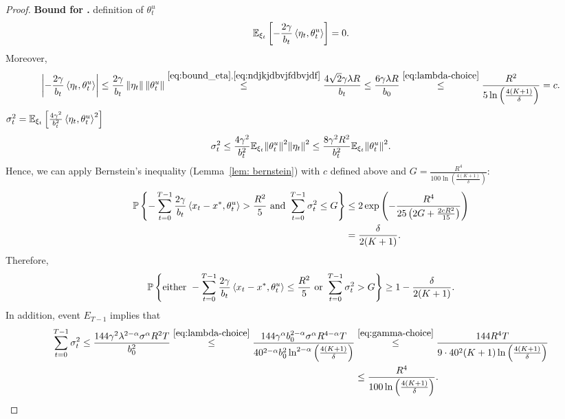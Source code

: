 \documentclass{article}
\begin{document}
\begin{proof}
    \textbf{Bound for \circledOne.}  definition of $\theta_t^u$ 
    \begin{align*}
        {\mathbb E}_{\xi_t} \left[-\frac{2\gamma}{b_t} \left \langle \eta_t, \theta_t^u \right \rangle\right] = 0.
    \end{align*}
    Moreover, 
    \begin{align*}
        \left|-\frac{2\gamma}{b_t} \left \langle \eta_t, \theta_t^u \right \rangle\right| \leq \frac{2\gamma}{b_t} \left\lVert\eta_t\right\rVert \left\lVert\theta_t^u\right\rVert \overset{\eqref{eq:bound_eta}, \eqref{eq:ndjkjdbvjfdbvjdf}}{\leq} \frac{4\sqrt{2}\gamma \lambda R}{b_t} \leq \frac{6\gamma \lambda R}{b_0} \overset{\eqref{eq:lambda-choice}}{\leq} \frac{R^2}{5 \ln\left(\frac{4(K+1)}{\delta}\right)}
        = c.
    \end{align*}
     $\sigma_t^2 = {\mathbb E}_{\xi_t}\left[\frac{4\gamma^2}{b_t^2}\left \langle \eta_t, \theta_t^u \right \rangle^2\right]$ 
    \begin{align}
        \sigma_t^2 \leq \frac{4\gamma^2}{b_t^2} {\mathbb E}_{\xi_t}{\left\lVert\theta_t^u\right\rVert}^2 {\left\lVert\eta_t\right\rVert}^2 \leq \frac{8\gamma^2R^2}{b_t^2} {\mathbb E}_{\xi_t}{\left\lVert\theta_t^u\right\rVert}^2. \label{eq:vjbdjvfjhdbfvjhdjf}
    \end{align}
    Hence, we can apply Bernstein's inequality (Lemma~\ref{lem: bernstein}) with $c$ defined above and $G = \frac{R^{4}}{100 \ln\left(\frac{4(K+1)}{\delta}\right)}$:
    \begin{align*}
        \mathbb{P}\left\{- \sum\limits_{t=0}^{T-1} \frac{2\gamma}{b_t}\left \langle x_t - x^*, \theta_t^u \right \rangle > \frac{R^2}{5} \text{ and } \sum\limits_{t=0}^{T-1}{\sigma}_t^2 \leq G \right\} &\leq 2\exp\left(-\frac{R^4}{25\left(2G + \frac{2cR^2}{15}\right)}\right)\\ &= \frac{\delta}{2(K+1)}.
    \end{align*}
    Therefore,
    \begin{align*}
        \mathbb{P}\left\{\text{either } - \sum\limits_{t=0}^{T-1} \frac{2\gamma}{b_t}\left \langle x_t - x^*, \theta_t^u \right \rangle \leq \frac{R^2}{5} \text{ or } \sum\limits_{t=0}^{T-1}{\sigma}_t^2 > G \right\} \geq 1 - \frac{\delta}{2(K+1)}.
    \end{align*}
    In addition, event $E_{T-1}$ implies that 
    \begin{align*}
        \sum\limits_{t=0}^{T-1}\sigma_t^2 \leq \frac{144\gamma^2\lambda^{2 - \alpha}\sigma^\alpha R^2 T}{b_0^2} \overset{\eqref{eq:lambda-choice}}{\leq} \frac{144\gamma^{\alpha}b_0^{2 - \alpha}\sigma^\alpha R^{4 - \alpha} T}{40^{2 - \alpha}b_0^2 \ln^{2 - \alpha}\left(\frac{4(K+1)}{\delta}\right)} & \overset{\eqref{eq:gamma-choice}}{\leq} \frac{144 R^{4} T}{9 \cdot 40^{2}(K+1) \ln\left(\frac{4(K+1)}{\delta}\right)} \\&\leq \frac{R^{4}}{100 \ln\left(\frac{4(K+1)}{\delta}\right)}.
    \end{align*}


\end{proof}
\end{document}
